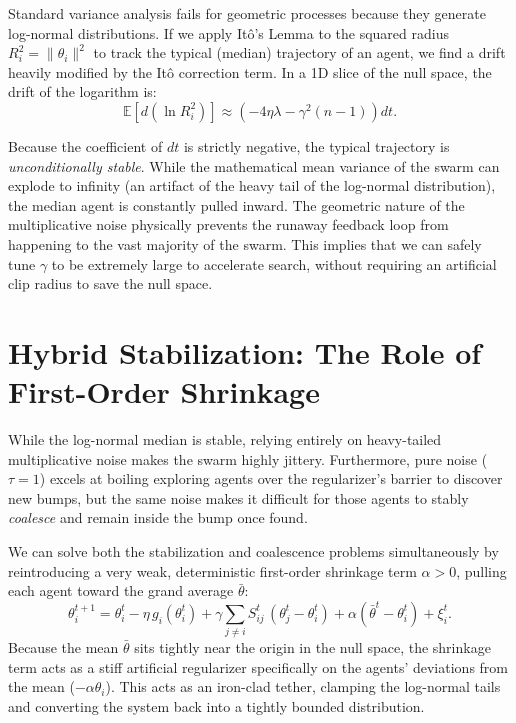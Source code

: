 \documentclass{article}
\begin{document}
Standard variance analysis fails for geometric processes because they generate log-normal distributions. If we apply It\^{o}'s Lemma to the squared radius $R_i^2 = \|\theta_i\|^2$ to track the typical (median) trajectory of an agent, we find a drift heavily modified by the It\^{o} correction term. In a 1D slice of the null space, the drift of the logarithm is:
\begin{equation}
  \mathbb{E}[ d(\ln R_i^2) ] \approx \left( -4\eta\lambda - \gamma^2(n-1) \right) dt.
\end{equation}

Because the coefficient of $dt$ is strictly negative, the typical trajectory is \emph{unconditionally stable}. While the mathematical mean variance of the swarm can explode to infinity (an artifact of the heavy tail of the log-normal distribution), the median agent is constantly pulled inward. The geometric nature of the multiplicative noise physically prevents the runaway feedback loop from happening to the vast majority of the swarm. This implies that we can safely tune $\gamma$ to be extremely large to accelerate search, without requiring an artificial clip radius to save the null space.

\section{Hybrid Stabilization: The Role of First-Order Shrinkage}

While the log-normal median is stable, relying entirely on heavy-tailed multiplicative noise makes the swarm highly jittery. Furthermore, pure noise ($\tau=1$) excels at boiling exploring agents over the regularizer's barrier to discover new bumps, but the same noise makes it difficult for those agents to stably \emph{coalesce} and remain inside the bump once found.

We can solve both the stabilization and coalescence problems simultaneously by reintroducing a very weak, deterministic first-order shrinkage term $\alpha > 0$, pulling each agent toward the grand average $\bar{\theta}$:
\begin{equation}
\theta_i^{t+1} = \theta_i^t - \eta\,g_i(\theta_i^t) + \gamma \sum_{j \neq i} S_{ij}^t\,(\theta_j^t - \theta_i^t) + \alpha (\bar{\theta}^t - \theta_i^t) + \xi_i^t.
\end{equation}
Because the mean $\bar{\theta}$ sits tightly near the origin in the null space, the shrinkage term acts as a stiff artificial regularizer specifically on the agents' deviations from the mean ($-\alpha \theta_i$). This acts as an iron-clad tether, clamping the log-normal tails and converting the system back into a tightly bounded distribution.
\end{document}
